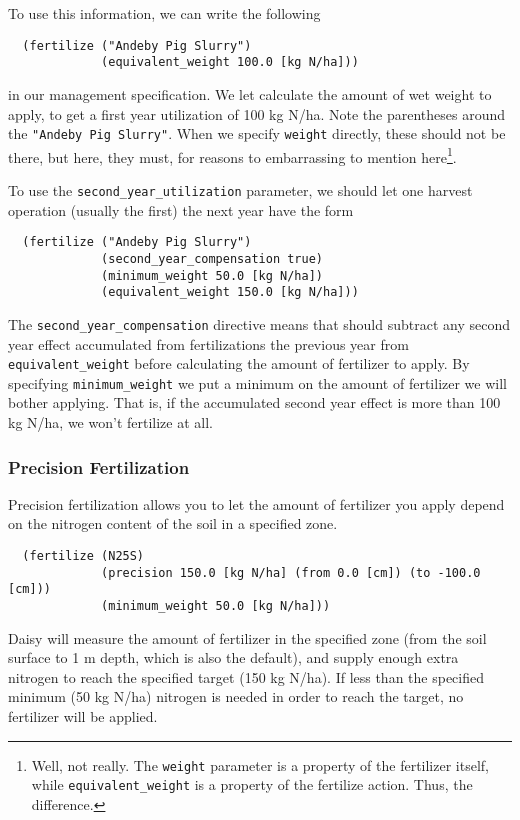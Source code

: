 \documentclass[a4paper,11pt]{article}
\begin{document}
To use this information, we can write the following
\begin{verbatim}
  (fertilize ("Andeby Pig Slurry")
             (equivalent_weight 100.0 [kg N/ha]))
\end{verbatim}
in our management specification.  We let \daisy{} calculate the amount
of wet weight to apply, to get a first year utilization of 100 kg
N/ha.  Note the parentheses around the \texttt{"Andeby Pig Slurry"}.
When we specify \texttt{weight} directly, these should not be there,
but here, they must, for reasons to embarrassing to mention
here\footnote{Well, not really.  The \texttt{weight} parameter is a
  property of the fertilizer itself, while \texttt{equivalent\_weight}
  is a property of the fertilize action.  Thus, the difference.}.

To use the \texttt{second\_year\_utilization} parameter, we should let
one harvest operation (usually the first) the next year have the form
\begin{verbatim}
  (fertilize ("Andeby Pig Slurry")
             (second_year_compensation true)
             (minimum_weight 50.0 [kg N/ha])
             (equivalent_weight 150.0 [kg N/ha]))
\end{verbatim}
The \texttt{second\_year\_compensation} directive means that \daisy{}
should subtract any second year effect accumulated from fertilizations
the previous year from \texttt{equivalent\_weight} before calculating
the amount of fertilizer to apply.  By specifying
\texttt{minimum\_weight} we put a minimum on the amount of fertilizer
we will bother applying.  That is, if the accumulated second year
effect is more than 100 kg N/ha, we won't fertilize at all.

\subsubsection{Precision Fertilization}

Precision fertilization allows you to let the amount of fertilizer you
apply depend on the nitrogen content of the soil in a specified zone.

\begin{verbatim}
  (fertilize (N25S)
             (precision 150.0 [kg N/ha] (from 0.0 [cm]) (to -100.0 [cm]))
             (minimum_weight 50.0 [kg N/ha]))
\end{verbatim}

Daisy will measure the amount of fertilizer in the specified zone (from
the soil surface to 1 m depth, which is also the default), and supply
enough extra nitrogen to reach the specified target (150 kg N/ha).  If
less than the specified minimum (50 kg N/ha) nitrogen is needed in
order to reach the target, no fertilizer will be applied.
\end{document}
